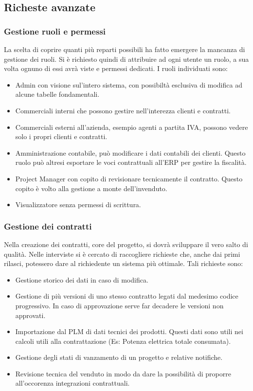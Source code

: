 \subsection{Richeste avanzate}
\subsubsection{Gestione ruoli e permessi}
La scelta di coprire quanti più reparti possibili ha fatto emergere la mancanza di gestione dei ruoli.
Si è richiesto quindi di attribuire ad ogni utente un ruolo, a sua volta ognuno di essi avrà viste e permessi dedicati.
I ruoli individuati sono:
\begin{itemize}
    \item Admin con visione sul'intero sistema, con possibiltà esclusiva di modifica ad alcune tabelle fondamentali.
    \item Commerciali interni che possono gestire nell'interezza clienti e contratti.
    \item Commerciali esterni all'azienda, esempio agenti a partita IVA, possono vedere solo i propri clienti e contratti.
    \item Amministrazione contabile, può modificare i dati contabili dei clienti. Questo ruolo può altresi esportare le voci contrattuali all'\ac{ERP} per gestire la fiscalità.
    \item Project Manager con copito di revisionare tecnicamente il contratto. Questo copito è volto alla gestione a monte dell'invenduto.
    \item Visualizzatore senza permessi di scrittura.
\end{itemize}
\subsubsection{Gestione dei contratti}
Nella creazione dei contratti, core del progetto, si dovrà sviluppare il vero salto di qualità.
Nelle interviste si è cercato di raccogliere richieste che, anche dai primi rilasci,
potessero dare al richiedente un sistema più ottimale.
Tali richieste sono:
\begin{itemize}
    \item Gestione storico dei dati in caso di modifica.
    \item Gestione di più versioni di uno stesso contratto legati dal medesimo codice progressivo.
    In caso di approvazione serve far decadere le versioni non approvati.
    \item Importazione dal \ac{PLM} di dati tecnici dei prodotti. Questi dati sono utili nei calcoli utili alla contrattazione (Es: Potenza elettrica totale consumata).
    \item Gestione degli stati di vanzamento di un progetto e relative notifiche.
    \item Revisione tecnica del venduto in modo da dare la possibilità di proporre all'occorenza integrazioni contrattuali.
\end{itemize}
